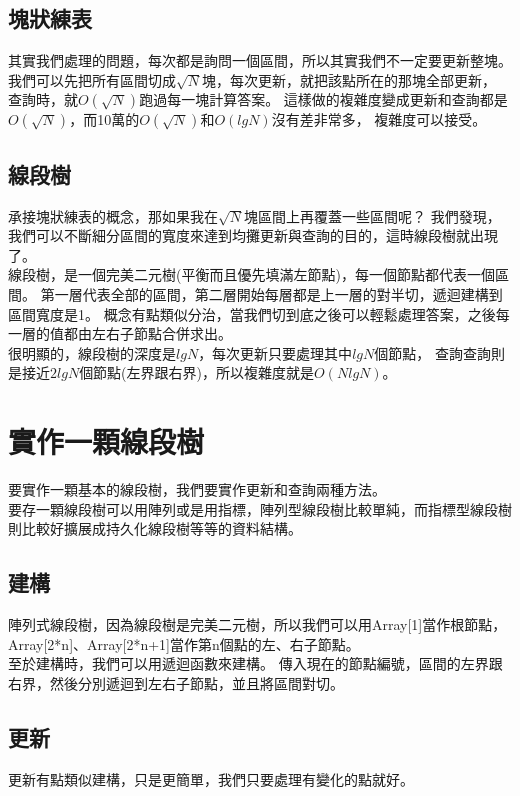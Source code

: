 \documentclass{article}
\begin{document}
\subsection{塊狀練表}
其實我們處理的問題，每次都是詢問一個區間，所以其實我們不一定要更新整塊。
我們可以先把所有區間切成$\sqrt N$塊，每次更新，就把該點所在的那塊全部更新，
查詢時，就$O(\sqrt N)$跑過每一塊計算答案。
這樣做的複雜度變成更新和查詢都是$O(\sqrt N)$，而10萬的$O(\sqrt N)$和$O(lg N)$沒有差非常多，
複雜度可以接受。

\subsection{線段樹}
承接塊狀練表的概念，那如果我在$\sqrt N$塊區間上再覆蓋一些區間呢？
我們發現，我們可以不斷細分區間的寬度來達到均攤更新與查詢的目的，這時線段樹就出現了。\\
線段樹，是一個完美二元樹(平衡而且優先填滿左節點)，每一個節點都代表一個區間。
第一層代表全部的區間，第二層開始每層都是上一層的對半切，遞迴建構到區間寬度是1。
概念有點類似分治，當我們切到底之後可以輕鬆處理答案，之後每一層的值都由左右子節點合併求出。\\
很明顯的，線段樹的深度是$lg N$，每次更新只要處理其中$lg N$個節點，
查詢查詢則是接近$2 lg N$個節點(左界跟右界)，所以複雜度就是$O(N lg N)$。



\section{實作一顆線段樹}
要實作一顆基本的線段樹，我們要實作更新和查詢兩種方法。\\
要存一顆線段樹可以用陣列或是用指標，陣列型線段樹比較單純，而指標型線段樹則比較好擴展成持久化線段樹等等的資料結構。\\

\subsection{建構}
陣列式線段樹，因為線段樹是完美二元樹，所以我們可以用Array[1]當作根節點，
Array[2*n]、Array[2*n+1]當作第n個點的左、右子節點。\\
至於建構時，我們可以用遞迴函數來建構。
傳入現在的節點編號，區間的左界跟右界，然後分別遞迴到左右子節點，並且將區間對切。

\subsection{更新}
更新有點類似建構，只是更簡單，我們只要處理有變化的點就好。
\end{document}
